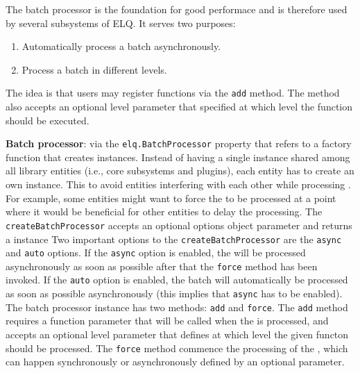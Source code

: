 \documentclass[a4paper,11pt]{kth-mag}
\newcommand{\code}[1]{\texttt{#1}}
\begin{document}
        The batch processor is the foundation for good performace and is therefore used by several subsystems of \gls{ELQ}.
        It serves two purposes:
        \begin{enumerate}
          \item Automatically process a batch asynchronously.
          \item Process a batch in different levels.
        \end{enumerate}

        The idea is that users may register functions via the \code{add} method.
        The method also accepts an optional level parameter that specified at which level the function should be executed.

        \textbf{Batch processor}: via the \code{elq.BatchProcessor} property that refers to a factory function that creates  instances.
        Instead of having a single  instance shared among all library entities (i.e., core subsystems and plugins), each entity has to create an own instance.
        This to avoid entities interfering with each other while processing .
        For example, some entities might want to force the  to be processed at a point where it would be beneficial for other entities to delay the processing.
        The \code{createBatchProcessor} accepts an optional options object parameter and returns a  instance
        Two important options to the \code{createBatchProcessor} are the \code{async} and \code{auto} options.
        If the \code{async} option is enabled, the  will be processed asynchronously as soon as possible after that the \code{force} method has been invoked.
        If the \code{auto} option is enabled, the batch will automatically be processed as soon as possible asynchronously (this implies that \code{async} has to be enabled).
        The batch processor instance has two methods: \code{add} and \code{force}.
        The \code{add} method requires a function parameter that will be called when the  is processed, and accepts an optional level parameter that defines at which level the given functon should be processed.
        The \code{force} method commence the processing of the , which can happen synchronously or asynchronously defined by an optional parameter.
\end{document}
